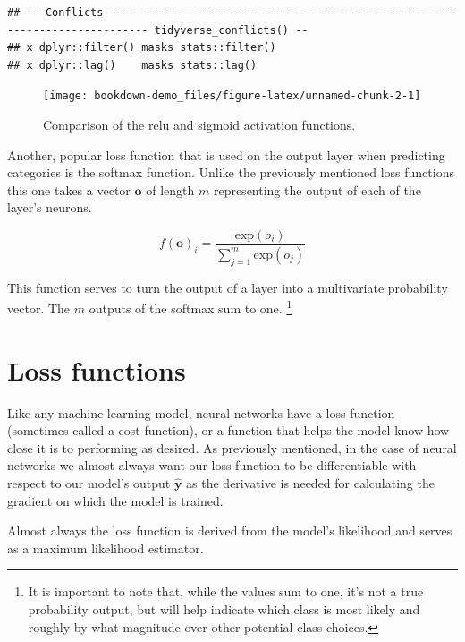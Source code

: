 \documentclass[]{book}
\let\rmarkdownfootnote\footnote%
\def\footnote{\protect\rmarkdownfootnote}
\theoremstyle{definition}
\theoremstyle{definition}
\theoremstyle{definition}
\theoremstyle{remark}
\let\BeginKnitrBlock\begin \let\EndKnitrBlock\end
\begin{document}
\begin{verbatim}
## -- Conflicts ---------------------------------------------------------------------------- tidyverse_conflicts() --
## x dplyr::filter() masks stats::filter()
## x dplyr::lag()    masks stats::lag()
\end{verbatim}

\begin{figure}

{\centering \texttt{[image: bookdown-demo\_files/figure-latex/unnamed-chunk-2-1]} 

}

\caption{Comparison of the relu and sigmoid activation functions.}\label{fig:unnamed-chunk-2}
\end{figure}

Another, popular loss function that is used on the output layer when
predicting categories is the softmax function. Unlike the previously
mentioned loss functions this one takes a vector \(\textbf{o}\) of
length \(m\) representing the output of each of the layer's neurons.

\BeginKnitrBlock{definition}[Softmax activation function.]
\protect\hypertarget{def:softmax}{}{\label{def:softmax} {}
}\[f(\textbf{o})_i = \frac{\text{exp}(o_i)}{\sum_{j = 1}^m \text{exp}(o_j)}\]
\EndKnitrBlock{definition}

This function serves to turn the output of a layer into a multivariate
probability vector. The \(m\) outputs of the softmax sum to one.
\footnote{It is important to note that, while the values sum to one,
  it's not a true probability output, but will help indicate which class
  is most likely and roughly by what magnitude over other potential
  class choices.}

\section{Loss functions}\label{loss-functions}

Like any machine learning model, neural networks have a loss function
(sometimes called a cost function), or a function that helps the model
know how close it is to performing as desired. As previously mentioned,
in the case of neural networks we almost always want our loss function
to be differentiable with respect to our model's output
\(\hat{\textbf{y}}\) as the derivative is needed for calculating the
gradient on which the model is trained.

Almost always the loss function is derived from the model's likelihood
and serves as a maximum likelihood estimator.
\end{document}
